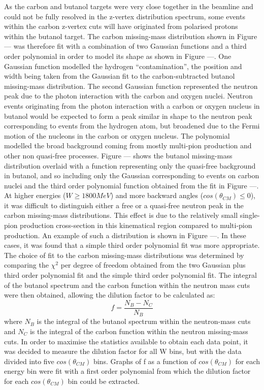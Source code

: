 As the carbon and butanol targets were very close together in the beamline and could not be fully resolved in the z-vertex distribution spectrum, some events within the carbon z-vertex cuts will have originated from polarised protons within the butanol target.
The carbon missing-mass distribution shown in Figure --- was therefore fit with a combination of two Gaussian functions and a third order polynomial in order to model its shape as shown in Figure ---. One Gaussian function modelled the hydrogen “contamination”, the position and width being taken from the Gaussian fit to the carbon-subtracted butanol missing-mass distribution. The second Gaussian function represented the neutron peak due to the photon interaction with the carbon and oxygen nuclei. Neutron events originating from the photon interaction with a carbon or oxygen nucleus in butanol would be expected to form a peak similar in shape to the neutron peak corresponding to events from the hydrogen atom, but broadened due to the Fermi motion of the nucleons in the carbon or oxygen nucleus. The polynomial modelled the broad background coming from mostly multi-pion production and other non quasi-free processes.
Figure --- shows the butanol missing-mass distribution overlaid with a function representing only the quasi-free background in butanol, and so including only the Gaussian corresponding to events on carbon nuclei and the third order polynomial function obtained from the fit in Figure ---.
At higher energies ($W\geq 1800 MeV$) and more backward angles ($cos(\theta_{CM}) \leq 0$), it was difficult to distinguish either a free or a quasi-free neutron peak in the carbon missing-mass distributions. This effect is due to the relatively small single- pion production cross-section in this kinematical region compared to multi-pion production. An example of such a distribution is shown in Figure ---. In these cases, it was found that a simple third order polynomial fit was more appropriate.
The choice of fit to the carbon missing-mass distributions was determined by comparing the $\chi^2$ per degree of freedom obtained from the two Gaussian plus third order polynomial fit and the simple third order polynomial fit.
The integral of the butanol spectrum and the carbon function within the neutron mass cuts  were then obtained, allowing the dilution factor to be calculated as:
$$
f = \frac{N_B - N_C}{N_B}
$$
where $N_B$ is the integral of the butanol spectrum within the neutron-mass cuts and $N_C$ is the integral of the carbon function within the neutron missing-mass cuts. In order to maximise the statistics available to obtain each data point, it was decided to measure the dilution factor for all W bins, but with the data divided into five $cos(\theta_{CM})$ bins. Graphs of f as a function of $cos(\theta_{CM})$ for each energy bin were fit with a first order polynomial from which the dilution factor for each $cos(\theta_{CM})$  bin could be extracted.
 
